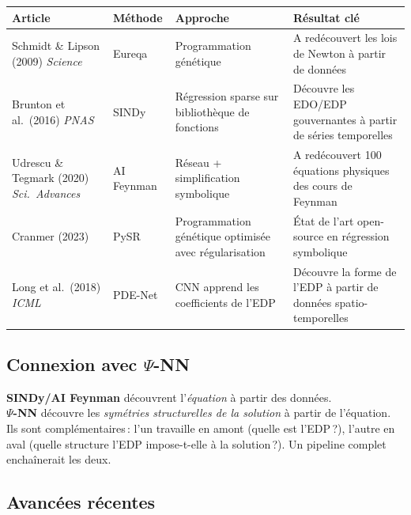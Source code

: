 \documentclass[11pt,a4paper]{article}
\begin{document}
\begin{center}
\renewcommand{\arraystretch}{1.3}
\begin{tabular}{@{}p{3.5cm} p{3cm} p{3cm} p{3cm}@{}}
\toprule
\textbf{Article} & \textbf{Méthode} & \textbf{Approche} & \textbf{Résultat clé} \\
\midrule
Schmidt \& Lipson (2009) \textit{Science} & Eureqa & Programmation génétique & A redécouvert les lois de Newton à partir de données \\
\addlinespace
Brunton et al.\ (2016) \textit{PNAS} & SINDy & Régression sparse sur bibliothèque de fonctions & Découvre les EDO/EDP gouvernantes à partir de séries temporelles \\
\addlinespace
Udrescu \& Tegmark (2020) \textit{Sci.\ Advances} & AI Feynman & Réseau + simplification symbolique & A redécouvert 100 équations physiques des cours de Feynman \\
\addlinespace
Cranmer (2023) & PySR & Programmation génétique optimisée avec régularisation & État de l'art open-source en régression symbolique \\
\addlinespace
Long et al.\ (2018) \textit{ICML} & PDE-Net & CNN apprend les coefficients de l'EDP & Découvre la forme de l'EDP à partir de données spatio-temporelles \\
\bottomrule
\end{tabular}
\end{center}

\subsection{Connexion avec $\Psi$-NN}

\begin{tcolorbox}[colback=symbolic!5,colframe=symbolic!70!black]
\small
\textbf{SINDy/AI Feynman} découvrent l'\emph{équation} à partir des données.\\
\textbf{$\Psi$-NN} découvre les \emph{symétries structurelles de la solution} à partir de l'équation.\\[3pt]
Ils sont complémentaires\,: l'un travaille en amont (quelle est l'EDP\,?), l'autre en aval (quelle structure l'EDP impose-t-elle à la solution\,?). Un pipeline complet enchaînerait les deux.
\end{tcolorbox}

\subsection{Avancées récentes}
\end{document}
